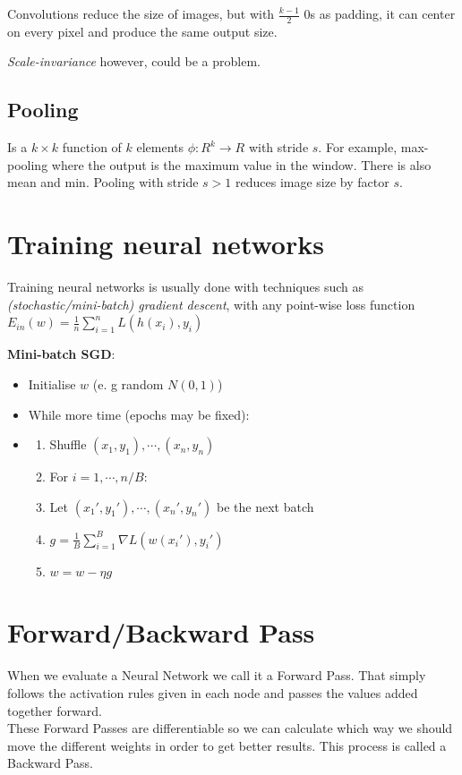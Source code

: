 \documentclass{article}
\begin{document}
  Convolutions reduce the size of images, but with $\frac{k-1}{2}$ $0$s as padding, it can center on every pixel and produce the same output size. 

  \emph{Scale-invariance} however, could be a problem. 

    \subsection{Pooling}
      Is a $k \times k$ function of $k$ elements $\phi : R^k \rightarrow R$ with stride $s$. For example, max-pooling where the output is the maximum value in the window. There is also mean and min. Pooling with stride $s > 1$ reduces image size by factor $s$. 
  
\section{Training neural networks}
  Training neural networks is usually done with techniques such as \emph{(stochastic/mini-batch) gradient descent}, with any point-wise loss function $E_{in}(w) = \frac{1}{n}\sum_{i=1}^{n}{L(h(x_i), y_i)}$
  
  \textbf{Mini-batch SGD}:
  \begin{itemize}
    \item Initialise $w$ (e. g random $N(0,1)$)
    \item While more time (epochs may be fixed):
    \item \begin{enumerate}
      \item Shuffle $(x_1, y_1), \cdots, (x_n, y_n)$
      \item For $i = 1, \cdots, n/B$:
      \item Let $(x_1', y_1'), \cdots, (x_n', y_n')$ be the next batch
      \item $g = \frac{1}{B} \sum_{i=1}^{B}{\nabla L (w(x_i'), y_i')}$
      \item $w = w - \eta g$
    \end{enumerate}
  \end{itemize}

\section{Forward/Backward Pass}
  When we evaluate a Neural Network we call it a Forward Pass. That simply follows the activation rules given in each node and passes the values added together forward.\\
  These Forward Passes are differentiable so we can calculate which way we should move the different weights in order to get better results. This process is called a Backward Pass.\\
  
\end{document}
